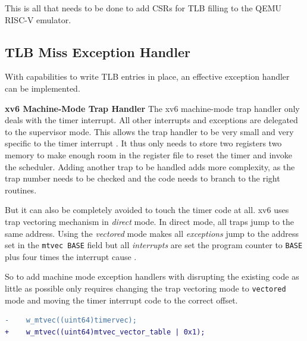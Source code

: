 This is all that needs to be done to add CSRs for TLB filling to the QEMU RISC-V emulator.




\subsection{TLB Miss Exception Handler}
With capabilities to write TLB entries in place, an effective exception handler can be implemented.

\textbf{xv6 Machine-Mode Trap Handler} The xv6 machine-mode trap handler only deals
with the timer interrupt. All other interrupts and exceptions are delegated to the supervisor
mode. This allows the trap handler to be very small and very specific to the timer interrupt \cite{cox2011xv6}.
It thus only needs to store two registers two memory to make enough room in the register file
to reset the timer and invoke the scheduler.
Adding another trap to be handled adds more complexity, as the trap number needs to be checked
and the code needs to branch to the right routines.

But it can also be completely avoided to touch the timer code at all. xv6 uses trap vectoring
mechanism in \textit{direct} mode. In direct mode, all traps jump to the same address.
Using the \textit{vectored} mode makes all \textit{exceptions} jump to the address set
in the \texttt{mtvec BASE} field but all \textit{interrupts} are set the program counter
to \texttt{BASE} plus four times the interrupt cause \cite{RISCVInstructionSet}.

So to add machine mode exception handlers with disrupting the existing code as little as possible only
requires changing the trap vectoring mode to \texttt{vectored} mode and moving the timer interrupt code
to the correct offset.

\begin{lstlisting}[language=diff]
-    w_mtvec((uint64)timervec);
+    w_mtvec((uint64)mtvec_vector_table | 0x1);
\end{lstlisting}

